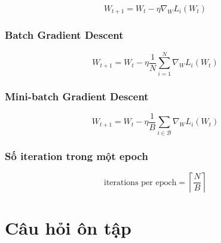 \documentclass[12pt,a4paper]{report}
\begin{document}
\[
    W_{t+1}
    =
    W_t
    -
    \eta
    \nabla_W L_i(W_t)
\]

\subsection*{Batch Gradient Descent}

\[
    W_{t+1}
    =
    W_t
    -
    \eta
    \frac{1}{N}
    \sum_{i=1}^{N}
    \nabla_W L_i(W_t)
\]

\subsection*{Mini-batch Gradient Descent}

\[
    W_{t+1}
    =
    W_t
    -
    \eta
    \frac{1}{B}
    \sum_{i\in \mathcal{B}}
    \nabla_W L_i(W_t)
\]

\subsection*{Số iteration trong một epoch}

\[
    \text{iterations per epoch}
    =
    \left\lceil
    \frac{N}{B}
    \right\rceil
\]

\chapter{Câu hỏi ôn tập}
\end{document}
